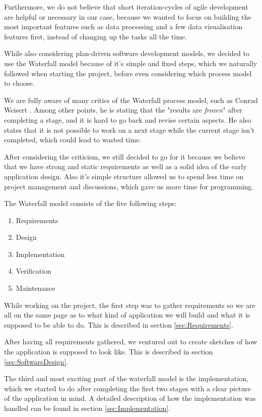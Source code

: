 \documentclass[12p]{article}
\begin{document}
Furthermore, we do not believe that short iteration-cycles of agile development are helpful or necessary in our case, because we wanted to focus on building the most important features such as data processing and a few data visualisation features first, instead of changing up the tasks all the time.

While also considering plan-driven software development models, we decided to use the Waterfall model because of it's simple and fixed steps, which we naturally followed when starting the project, before even considering which process model to choose.

We are fully aware of many critics of the Waterfall process model, such as Conrad Weisert \cite{WaterfallSucks}. Among other points, he is stating that the "results are \textit{frozen}" after completing a stage, and it is hard to go back and revise certain aspects. He also states that it is not possible to work on a next stage while the current stage isn't completed, which could lead to wasted time.

After considering the criticism, we still decided to go for it because we believe that we have strong and static requirements as well as a solid idea of the early application design. Also it's simple structure allowed us to spend less time on project management and discussions, which gave us more time for programming.

The Waterfall model consists of the five following steps:
\begin{enumerate}
    \item Requirements
    \item Design
    \item Implementation
    \item Verification
    \item Maintenance
\end{enumerate}

While working on the project, the first step was to gather requirements so we are all on the same page as to what kind of application we will build and what it is supposed to be able to do. This is described in section \ref{sec:Requirements}.

After having all requirements gathered, we ventured out to create sketches of how the application is supposed to look like. This is described in section \ref{sec:SoftwareDesign}.

The third and most exciting part of the waterfall model is the implementation, which we started to do after completing the first two stages with a clear picture of the application in mind. A detailed description of how the implementation was handled can be found in section \ref{sec:Implementation}.
\end{document}
